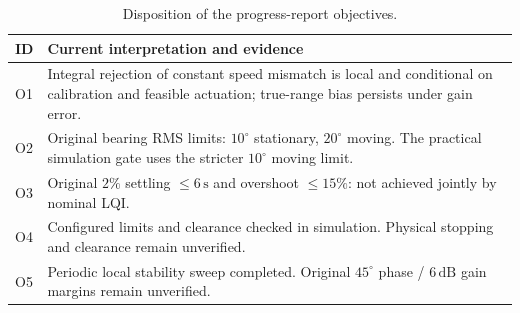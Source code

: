 \begin{table}[t]
\caption{Disposition of the progress-report objectives.}
\label{tab:spec}\centering\footnotesize
\begin{tabularx}{\columnwidth}{@{}lX@{}}\toprule
ID & Current interpretation and evidence\\\midrule
O1 & Integral rejection of constant speed mismatch is local and conditional on calibration and feasible actuation; true-range bias persists under gain error.\\
O2 & Original bearing RMS limits: $10^\circ$ stationary, $20^\circ$ moving. The practical simulation gate uses the stricter $10^\circ$ moving limit.\\
O3 & Original $2\%$ settling $\le6\,\mathrm s$ and overshoot $\le15\%$: not achieved jointly by nominal LQI.\\
O4 & Configured limits and clearance checked in simulation. Physical stopping and clearance remain unverified.\\
O5 & Periodic local stability sweep completed. Original $45^\circ$ phase / $6\,\mathrm{dB}$ gain margins remain unverified.\\\bottomrule
\end{tabularx}
\end{table}

